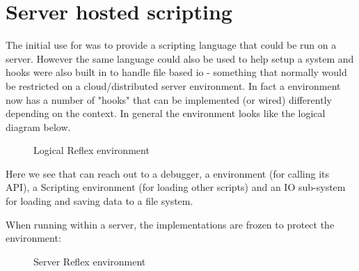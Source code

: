 \chapter{Server hosted scripting}
The initial use for \Reflex was to provide a scripting language that could be run on a server. However the same language could also be used to help setup a \Rapture system and hooks were also built in to handle file based io - something that normally would be restricted on a cloud/distributed server environment. In fact a \Reflex environment now has a number of "hooks" that can be implemented (or wired) differently depending on the context. In general the environment looks like the logical diagram below.

\begin{figure}[H]
\centering
{}
\caption { Logical Reflex environment }
\end{figure}

Here we see that \Reflex can reach out to a debugger, a \Rapture environment (for calling its API), a Scripting environment (for loading other scripts) and an IO sub-system for loading and saving data to a file system.

When running within a \Rapture server, the implementations are frozen to protect the environment:

\begin{figure}[H]
\centering
{}
\caption { Server Reflex environment }
\end{figure}

